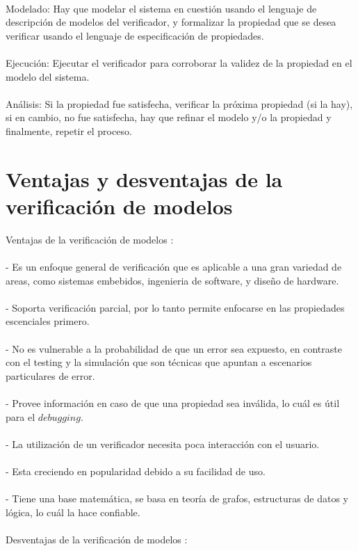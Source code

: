 \\
Modelado: Hay que modelar el sistema en cuestión usando el lenguaje de descripción de modelos del verificador, y formalizar la propiedad que se desea verificar usando el lenguaje de especificación de propiedades.\\
\\
Ejecución: Ejecutar el verificador para corroborar la validez de la propiedad en el modelo del sistema.\\
\\
Análisis: Si la propiedad fue satisfecha, verificar la próxima propiedad (si la hay), si en cambio, no fue satisfecha, hay que refinar el modelo y/o la propiedad y finalmente, repetir el proceso.\\

\section{Ventajas y desventajas de la verificación de modelos}
Ventajas de la verificación de modelos \cite{Baier:2}:\\
\\
- Es un enfoque general de verificación que es aplicable a una gran variedad de areas, como sistemas embebidos, ingenieria de software, y diseño de hardware.\\
\\
- Soporta verificación parcial, por lo tanto permite enfocarse en las propiedades escenciales primero.\\
\\
- No es vulnerable a la probabilidad de que un error sea expuesto, en contraste con el testing y la simulación que son técnicas que apuntan a escenarios particulares de error.\\
\\
- Provee información en caso de que una propiedad sea inválida, lo cuál es útil para el $debugging$.\\
\\
- La utilización de un verificador necesita poca interacción con el usuario.\\
\\
- Esta creciendo en popularidad debido a su facilidad de uso.\\
\\
- Tiene una base matemática, se basa en teoría de grafos, estructuras de datos y lógica, lo cuál la hace confiable.\\
\\
Desventajas de la verificación de modelos \cite{Baier:2}:\\
